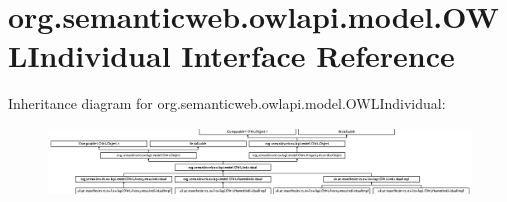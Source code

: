 \hypertarget{interfaceorg_1_1semanticweb_1_1owlapi_1_1model_1_1_o_w_l_individual}{\section{org.\-semanticweb.\-owlapi.\-model.\-O\-W\-L\-Individual Interface Reference}
\label{interfaceorg_1_1semanticweb_1_1owlapi_1_1model_1_1_o_w_l_individual}
}
Inheritance diagram for org.\-semanticweb.\-owlapi.\-model.\-O\-W\-L\-Individual\-:\begin{figure}[H]
\begin{center}
\leavevmode
\includegraphics[height=1.796791cm]{interfaceorg_1_1semanticweb_1_1owlapi_1_1model_1_1_o_w_l_individual}
\end{center}
\end{figure}

